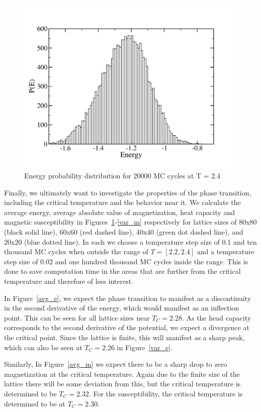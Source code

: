 \documentclass[prc,amsmath,twocolumn,superscriptaddress]{revtex4}
\begin{document}
\begin{figure}[t]
\includegraphics[scale=0.33]{ei_2.pdf}
\caption{Energy probability distribution for 20000 MC cycles at T = 2.4}
\label{ei_2}
\end{figure}

Finally, we ultimately want to investigate the properties of the phase transition, including the critical temperature and the behavior near it. We calculate the average energy, average absolute value of magnetization, heat capacity and magnetic susceptibility in Figures~\ref{ei_2}-\ref{var_m} respectively for lattice sizes of 80x80 (black solid line), 60x60 (red dashed line), 40x40 (green dot dashed line), and 20x20 (blue dotted line). In each we choose a temperature step size of 0.1 and ten thousand MC cycles when outside the range of $T=[2.2,2.4]$ and a temperature step size of 0.02 and one hundred thousand MC cycles inside the range. This is done to save computation time in the areas that are further from the critical temperature and therefore of less interest.

In Figure~\ref{avg_e}, we expect the phase transition to manifest as a discontinuity in the second derivative of the energy, which would manifest as an inflection point. This can be seen for all lattice sizes near $T_C=2.28$. As the head capacity corresponds to the second derivative of the potential, we expect a divergence at the critical point. Since the lattice is finite, this will manifest as a sharp peak, which can also be seen at $T_C=2.26$ in Figure~\ref{var_e}.

Similarly, In Figure~\ref{avg_m} we expect there to be a sharp drop to zero magnetization at the critical temperature. Again due to the finite size of the lattice there will be some deviation from this, but the critical temperature is determined to be $T_C=2.32$. For the susceptibility, the critical temperature is determined to be at $T_C=2.30$.
\end{document}
